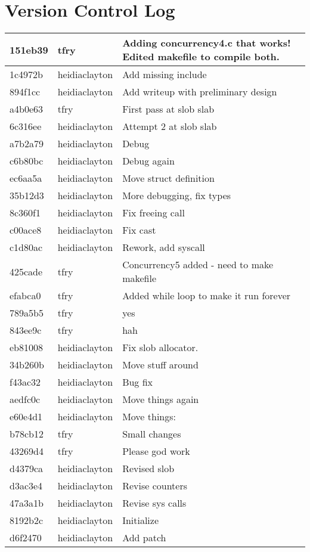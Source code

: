 \documentclass{article}
\begin{document}
\section{Version Control Log}
\begin{tabular}{l l l}
{151eb39} & tfry & Adding concurrency4.c that works! Edited makefile to compile both.\\\hline
{1c4972b} & heidiaclayton & Add missing include\\\hline
{894f1cc} & heidiaclayton & Add writeup with preliminary design\\\hline
{a4b0e63} & tfry & First pass at slob slab\\\hline
{6c316ee} & heidiaclayton & Attempt 2 at slob slab\\\hline
{a7b2a79} & heidiaclayton & Debug\\\hline
{c6b80bc} & heidiaclayton & Debug again\\\hline
{ec6aa5a} & heidiaclayton & Move struct definition\\\hline
{35b12d3} & heidiaclayton & More debugging, fix types\\\hline
{8c360f1} & heidiaclayton & Fix freeing call\\\hline
{c00ace8} & heidiaclayton & Fix cast\\\hline
{c1d80ac} & heidiaclayton & Rework, add syscall\\\hline
{425cade} & tfry & Concurrency5 added - need to make makefile\\\hline
{efabca0} & tfry & Added while loop to make it run forever\\\hline
{789a5b5} & tfry & yes\\\hline
{843ee9c} & tfry & hah\\\hline
{eb81008} & heidiaclayton & Fix slob allocator.\\\hline
{34b260b} & heidiaclayton & Move stuff around\\\hline
{f43ac32} & heidiaclayton & Bug fix\\\hline
{aedfc0c} & heidiaclayton & Move things again\\\hline
{e60e4d1} & heidiaclayton & Move things:\\\hline
{b78cb12} & tfry & Small changes\\\hline
{43269d4} & tfry & Please god work\\\hline
{d4379ca} & heidiaclayton & Revised slob\\\hline
{d3ac3e4} & heidiaclayton & Revise counters\\\hline
{47a3a1b} & heidiaclayton & Revise sys calls\\\hline
{8192b2c} & heidiaclayton & Initialize\\\hline
{d6f2470} & heidiaclayton & Add patch\\\hline
\end{tabular}
\end{document}
